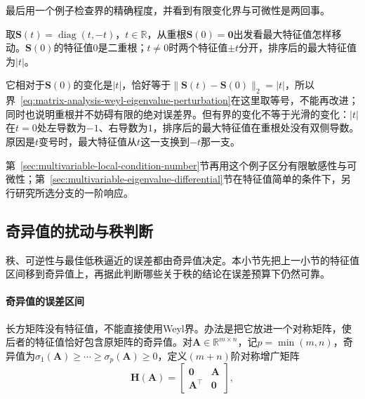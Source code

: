 最后用一个例子检查界的精确程度，并看到有限变化界与可微性是两回事。
\begin{example}[重根处的最大特征值]
\label{ex:ls-weyl-double-root}
取$\bm S(t)=\operatorname{diag}(t,-t)$，$t\in\mathbb R$，从重根$\bm S(0)=\bm0$出发看最大特征值怎样移动。$\bm S(0)$的特征值$0$是二重根；$t\neq0$时两个特征值$\pm t$分开，排序后的最大特征值为$|t|$。

它相对于$\bm S(0)$的变化是$|t|$，恰好等于$\lVert\bm S(t)-\bm S(0)\rVert_2=|t|$，所以界~\eqref{eq:matrix-analysis-weyl-eigenvalue-perturbation}在这里取等号，不能再改进；同时也说明重根并不妨碍有限的绝对误差界。但有界的变化不等于光滑的变化：$|t|$在$t=0$处左导数为$-1$、右导数为$1$，排序后的最大特征值在重根处没有双侧导数。原因是$t$变号时，最大特征值从$t$这一支换到$-t$那一支。
\end{example}
第~\ref{sec:multivariable-local-condition-number}节再用这个例子区分有限敏感性与可微性；第~\ref{sec:multivariable-eigenvalue-differential}节在特征值简单的条件下，另行研究所选分支的一阶响应。

\subsection{奇异值的扰动与秩判断}
\label{sec:ls-singular-value-sensitivity}

秩、可逆性与最佳低秩逼近的误差都由奇异值决定。本小节先把上一小节的特征值区间移到奇异值上，再据此判断哪些关于秩的结论在误差预算下仍然可靠。

\paragraph{奇异值的误差区间}

长方矩阵没有特征值，不能直接使用Weyl界。办法是把它放进一个对称矩阵，使后者的特征值恰好包含原矩阵的奇异值。对$\bm A\in\mathbb R^{m\times n}$，记$p=\min(m,n)$，奇异值为$\sigma_1(\bm A)\geq\cdots\geq\sigma_p(\bm A)\geq0$，定义$(m+n)$阶对称增广矩阵
\[
 \bm H(\bm A)=\begin{bmatrix}\bm0&\bm A\\\bm A^\top&\bm0\end{bmatrix},
\]

